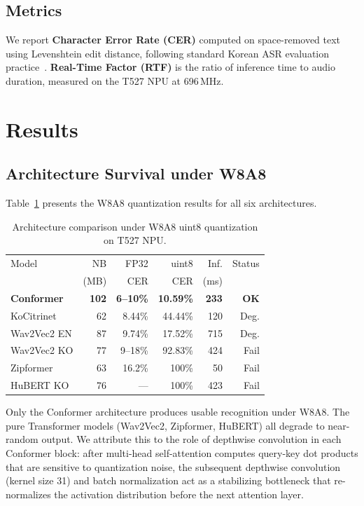 \documentclass[a4paper,11pt,twocolumn]{article}
\begin{document}
\subsection{Metrics}

We report \textbf{Character Error Rate (CER)} computed on space-removed text using Levenshtein edit distance, following standard Korean ASR evaluation practice~\cite{koo2021}. \textbf{Real-Time Factor (RTF)} is the ratio of inference time to audio duration, measured on the T527 NPU at 696\,MHz.

\section{Results}

\subsection{Architecture Survival under W8A8}

Table~\ref{tab:arch} presents the W8A8 quantization results for all six architectures.

\begin{table}[t]
\centering
\caption{Architecture comparison under W8A8 uint8 quantization on T527 NPU.}
\label{tab:arch}
\small
\begin{tabular}{@{}lrrrrr@{}}
\toprule
Model & NB & FP32 & uint8 & Inf. & Status \\
 & (MB) & CER & CER & (ms) & \\
\midrule
\textbf{Conformer} & \textbf{102} & \textbf{6--10\%} & \textbf{10.59\%} & \textbf{233} & \textbf{OK} \\
KoCitrinet & 62 & 8.44\% & 44.44\% & 120 & Deg. \\
Wav2Vec2 EN & 87 & 9.74\% & 17.52\% & 715 & Deg. \\
Wav2Vec2 KO & 77 & 9--18\% & 92.83\% & 424 & Fail \\
Zipformer & 63 & 16.2\% & 100\% & 50 & Fail \\
HuBERT KO & 76 & --- & 100\% & 423 & Fail \\
\bottomrule
\end{tabular}
\end{table}

Only the Conformer architecture produces usable recognition under W8A8. The pure Transformer models (Wav2Vec2, Zipformer, HuBERT) all degrade to near-random output. We attribute this to the role of depthwise convolution in each Conformer block: after multi-head self-attention computes query-key dot products that are sensitive to quantization noise, the subsequent depthwise convolution (kernel size 31) and batch normalization act as a stabilizing bottleneck that re-normalizes the activation distribution before the next attention layer.
\end{document}
